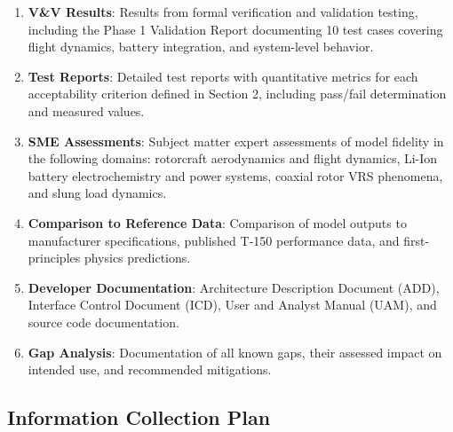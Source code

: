 \documentclass[11pt, letterpaper]{article}
\begin{document}
\begin{enumerate}
    \item \unclass \textbf{V\&V Results}: Results from formal verification and validation testing, including the Phase 1 Validation Report documenting 10 test cases covering flight dynamics, battery integration, and system-level behavior.
    \item \unclass \textbf{Test Reports}: Detailed test reports with quantitative metrics for each acceptability criterion defined in Section 2, including pass/fail determination and measured values.
    \item \unclass \textbf{SME Assessments}: Subject matter expert assessments of model fidelity in the following domains: rotorcraft aerodynamics and flight dynamics, Li-Ion battery electrochemistry and power systems, coaxial rotor VRS phenomena, and slung load dynamics.
    \item \unclass \textbf{Comparison to Reference Data}: Comparison of model outputs to manufacturer specifications, published T-150 performance data, and first-principles physics predictions.
    \item \unclass \textbf{Developer Documentation}: Architecture Description Document (ADD), Interface Control Document (ICD), User and Analyst Manual (UAM), and source code documentation.
    \item \unclass \textbf{Gap Analysis}: Documentation of all known gaps, their assessed impact on intended use, and recommended mitigations.
\end{enumerate}

\subsection{\unclass Information Collection Plan}
\end{document}
